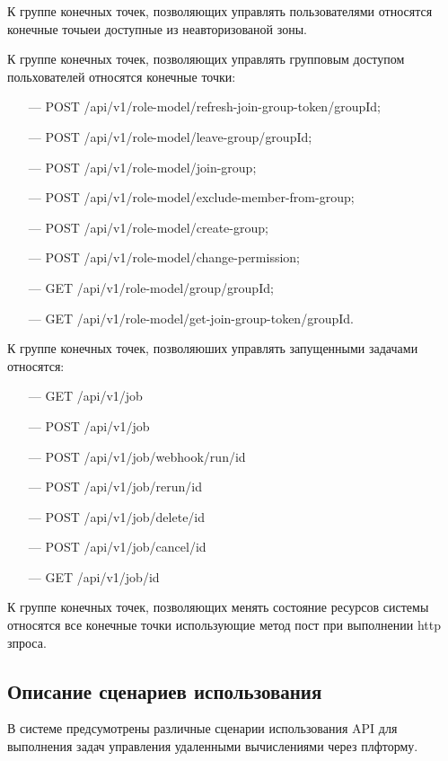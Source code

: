 К группе конечных точек, позволяющих управлять пользователями относятся конечные точыеи доступные из неавторизованой зоны.

К группе конечных точек, позволяющих управлять групповым доступом польхователей относятся конечные точки:

\begin{itemize}
  \item[---] POST /api/v1/role-model/refresh-join-group-token/{groupId};
  \item[---] POST /api/v1/role-model/leave-group/{groupId};
  \item[---] POST /api/v1/role-model/join-group;
  \item[---] POST /api/v1/role-model/exclude-member-from-group;
  \item[---] POST /api/v1/role-model/create-group;
  \item[---] POST /api/v1/role-model/change-permission;
  \item[---] GET /api/v1/role-model/group/{groupId};
  \item[---] GET /api/v1/role-model/get-join-group-token/{groupId}.
\end{itemize}

К группе конечных точек, позволяюших управлять запущенными задачами относятся:

\begin{itemize}
  \item[---] GET /api/v1/job
  \item[---] POST /api/v1/job
  \item[---] POST /api/v1/job/webhook/run/{id}
  \item[---] POST /api/v1/job/rerun/{id}
  \item[---] POST /api/v1/job/delete/{id}
  \item[---] POST /api/v1/job/cancel/{id}
  \item[---] GET /api/v1/job/{id}
\end{itemize}

К группе конечных точек, позволяющих менять состояние ресурсов системы относятся все конечные точки использующие метод пост при выполнении http зпроса.

\subsection{Описание сценариев использования}

В системе предсумотрены различные сценарии использования API для выполнения задач управления удаленными вычислениями через плфторму.

